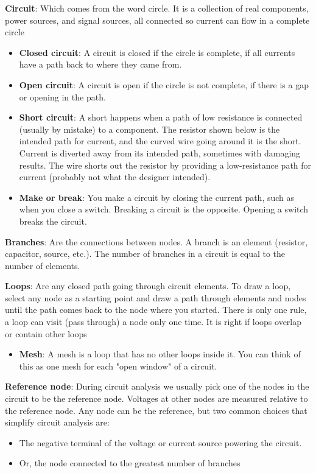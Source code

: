 \documentclass[a4paper]{article}
\begin{document}
\begin{itemize}
{\item \textbf{Circuit}: Which comes from the word circle. It is a collection of real components, power sources, and signal sources, all connected so current can flow in a complete circle
\begin{itemize}
\item \textbf{Closed circuit}: A circuit is closed if the circle is complete, if all currents have a path back to where they came from.
\item \textbf{Open circuit}: A circuit is open if the circle is not complete, if there is a gap or opening in the path.
\item \textbf{Short circuit}: A short happens when a path of low resistance is connected (usually by mistake) to a component. The resistor shown below is the intended path for current, and the curved wire going around it is the short. Current is diverted away from its intended path, sometimes with damaging results. The wire shorts out the resistor by providing a low-resistance path for current (probably not what the designer intended).
\item \textbf{Make or break}: You make a circuit by closing the current path, such as when you close a switch. Breaking a circuit is the opposite. Opening a switch breaks the circuit.
\end{itemize}}
\item \textbf{Branches}: Are the connections between nodes. A branch is an element (resistor, capacitor, source, etc.). The number of branches in a circuit is equal to the number of elements.
{\item \textbf{Loops}: Are any closed path going through circuit elements. To draw a loop, select any node as a starting point and draw a path through elements and nodes until the path comes back to the node where you started. There is only one rule, a loop can visit (pass through) a node only one time. It is right if loops overlap or contain other loops
\begin{itemize}
\item \textbf{Mesh}: A mesh is a loop that has no other loops inside it. You can think of this as one mesh for each "open window" of a circuit.
\end{itemize}}
{\item \textbf{Reference node}: During circuit analysis we usually pick one of the nodes in the circuit to be the reference node. Voltages at other nodes are measured relative to the reference node. Any node can be the reference, but two common choices that simplify circuit analysis are:
\begin{itemize}
\item The negative terminal of the voltage or current source powering the circuit.
\item Or, the node connected to the greatest number of branches
\end{itemize}}
\end{itemize}
\end{document}
